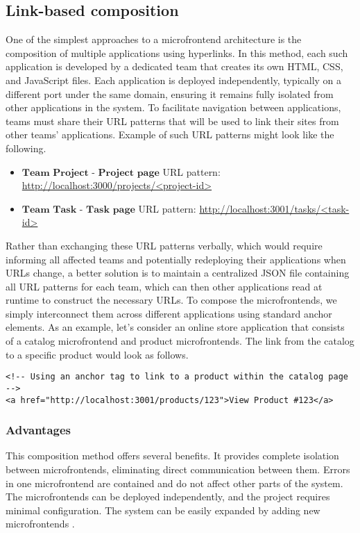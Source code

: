 \subsection{Link-based composition}
One of the simplest approaches to a microfrontend architecture is the composition of multiple applications using hyperlinks. In this method, each such application is developed by a dedicated team that creates its own HTML, CSS, and JavaScript files. Each application is deployed independently, typically on a different port under the same domain, ensuring it remains fully isolated from other applications in the system. To facilitate navigation between applications, teams must share their URL patterns that will be used to link their sites from other teams' applications.\cite{Geers} Example of such URL patterns might look like the following.
\begin{itemize}
\item $\textbf{Team Project - Project page}$ \newline
URL pattern: \url{http://localhost:3000/projects/<project-id>}
\item $\textbf{Team Task - Task page}$ \newline
URL pattern: \url{http://localhost:3001/tasks/<task-id>}
\end{itemize}

\noindent
Rather than exchanging these URL patterns verbally, which would require informing all affected teams and potentially redeploying their applications when URLs change, a better solution is to maintain a centralized JSON file containing all URL patterns for each team, which can then other applications read at runtime to construct the necessary URLs. To compose the microfrontends, we simply interconnect them across different applications using standard anchor elements. As an example, let's consider an online store application that consists of a catalog microfrontend and product microfrontends. The link from the catalog to a specific product would look as follows.
\begin{verbatim}
<!-- Using an anchor tag to link to a product within the catalog page 
-->
<a href="http://localhost:3001/products/123">View Product #123</a>
\end{verbatim}

\subsubsection{Advantages}
This composition method offers several benefits. It provides complete isolation between microfrontends, eliminating direct communication between them. Errors in one microfrontend are contained and do not affect other parts of the system. The microfrontends can be deployed independently, and the project requires minimal configuration. The system can be easily expanded by adding new microfrontends \cite{Geers}.

